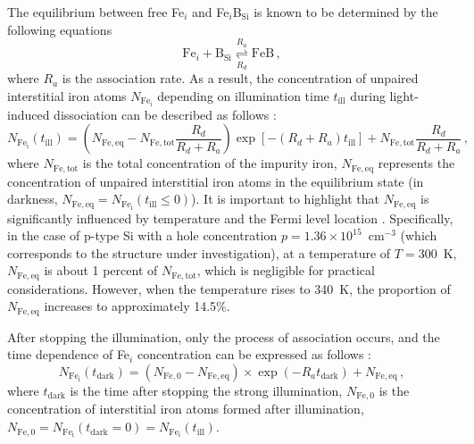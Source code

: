 \documentclass{WileyMSP-template}
\begin{document}
The equilibrium between free Fe$_i$ and Fe$_i$B$_\mathrm{Si}$ is known to be determined by the following equations \cite{FeB:kinetic,Sun2021,FeBAssJAP2014}
\begin{equation}
\label{eqReac}
\mathrm{Fe}_i+\mathrm{B}_\mathrm{Si}  \overset{R_a}{\underset{R_d}{\rightleftharpoons{}}} \mathrm{FeB}\,,
\end{equation}
where
$R_a$ is the association rate.
As a result, the concentration of unpaired interstitial iron atoms $N_\mathrm{Fe_i}$ depending on illumination time $t_\mathrm{ill}$
during light-induced dissociation can be described as follows \cite{FeBLight2,FeBKin2019,Olikh2021JAP}:
\begin{equation}
\label{eqNfeill}
N_\mathrm{Fe_i}(t_\mathrm{ill})=\left(N_\mathrm{Fe,eq}-N_\mathrm{Fe,tot}
\frac{R_d}{R_d+R_a}\right)\exp[-(R_d+R_a)t_\mathrm{ill}]+N_\mathrm{Fe,tot}\frac{R_d}{R_d+R_a}\,,
\end{equation}
where
$N_\mathrm{Fe,tot}$ is the total concentration of the impurity iron,
$N_\mathrm{Fe,eq}$ represents the concentration of unpaired interstitial iron atoms in the equilibrium state
(in darkness, $N_\mathrm{Fe,eq}=N_\mathrm{Fe_i}(t_\mathrm{ill}\leq0)$).
It is important to highlight that $N_\mathrm{Fe,eq}$ is significantly influenced
by temperature and the Fermi level location \cite{FeB:kinetic}.
Specifically, in the case of p-type Si with a hole concentration $p=1.36\times10^{15}$~cm$^{-3}$
(which corresponds to the structure under investigation),
at a temperature of $T=300$~K, $N_\mathrm{Fe,eq}$ is about 1 percent of $N_\mathrm{Fe,tot}$,
which is negligible for practical considerations.
However, when the temperature rises to 340~K, the proportion of $N_\mathrm{Fe,eq}$ increases to approximately 14.5\%.

After stopping the illumination, only the process of association occurs,
and the time dependence of Fe$_i$ concentration can be expressed as follows \cite{FeB:kinetic,MurphyJAP2011}:
\begin{equation}
\label{eqNFet}
N_\mathrm{Fe_i}(t_\mathrm{dark})=(N_\mathrm{Fe,0}-N_\mathrm{Fe,eq})\times
\exp(-R_a t_\mathrm{dark})+N_\mathrm{Fe,eq}\,,
\end{equation}
where $t_\mathrm{dark}$ is the time after stopping the strong illumination,
$N_\mathrm{Fe,0}$ is the concentration of interstitial iron atoms formed after illumination,
$N_\mathrm{Fe,0}=N_\mathrm{Fe_i}(t_\mathrm{dark}=0)=N_\mathrm{Fe_i}(t_\mathrm{ill})$.
\end{document}
